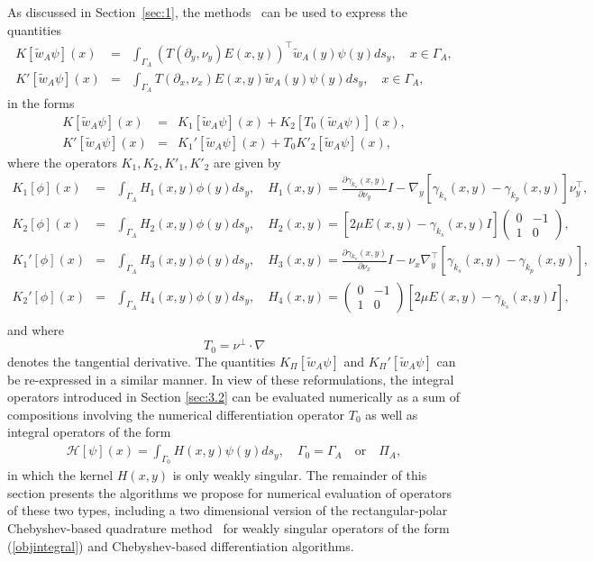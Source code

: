 \documentclass[10pt]{article}
\numberwithin{equation}{section}
\newcommand{\be}{\begin{eqnarray}}
\newcommand{\ben}{\begin{eqnarray*}}
\newcommand{\en}{\end{eqnarray}}
\newcommand{\enn}{\end{eqnarray*}}
\newcommand{\pa}{\partial}
\begin{document}
As discussed in Section~\ref{sec:1}, the methods~\cite{YHX17} can be used to express the
quantities \be
\label{KWA}
K[\widetilde{w}_A\psi](x)&=&\int_{\Gamma_A} (T(\pa_y,\nu_y)E(x,y))^\top \widetilde{w}_A(y)\psi(y)ds_y,\quad x\in\Gamma_A,\\
\label{KPWA}
K'[\widetilde{w}_A\psi](x)&=&\int_{\Gamma_A}
T(\pa_x,\nu_x)E(x,y)\widetilde{w}_A(y)\psi(y)ds_y,\quad x\in\Gamma_A,
\en 
in the forms
\be
\label{operatorK}
K[\widetilde{w}_A\psi](x) &=& K_1[\widetilde{w}_A\psi](x)+K_2\left[ T_0(\widetilde{w}_A\psi) \right](x),\\
\label{operatorKP}
K'[\widetilde{w}_A\psi](x) &=& K_1'[\widetilde{w}_A\psi](x)+T_0K'_2\left[\widetilde{w}_A\psi \right](x),
\en
where the operators $K_1,K_2,K'_1,K'_2$ are given by
\ben
K_1[\phi](x) &=& \int_{\Gamma_A} H_1(x,y)\phi(y)ds_y, \quad H_1(x,y)=\frac{\pa \gamma_{k_s}(x,y)}{\pa\nu_y}I- \nabla_y[\gamma_{k_s}(x,y)-\gamma_{k_p}(x,y)]\nu_y^\top,\\
K_2[\phi](x) &=& \int_{\Gamma_A} H_2(x,y)\phi(y)ds_y, \quad H_2(x,y)=[2\mu E(x,y)-\gamma_{k_s}(x,y)I]\begin{pmatrix}
0 & -1 \\
1 & 0
\end{pmatrix},\\
K_1'[\phi](x) &=& \int_{\Gamma_A} H_3(x,y)\phi(y)ds_y, \quad H_3(x,y)=\frac{\pa \gamma_{k_s}(x,y)}{\pa\nu_x}I- \nu_x\nabla_y^\top[\gamma_{k_s}(x,y)-\gamma_{k_p}(x,y)],\\
K_2'[\phi](x) &=& \int_{\Gamma_A} H_4(x,y)\phi(y)ds_y, \quad H_4(x,y)=\begin{pmatrix}
0 & -1 \\
1 & 0
\end{pmatrix}[2\mu E(x,y)-\gamma_{k_s}(x,y)I],\\
\enn and where
\[T_0=\nu^\perp\cdot\nabla\]
denotes the tangential
derivative. The quantities $K_\Pi[\widetilde{w}_A\psi]$ and
$K_\Pi'[\widetilde{w}_A\psi]$ can be re-expressed in a similar
manner. In view of these reformulations, the integral operators
introduced in Section \ref{sec:3.2} can be evaluated numerically as a
sum of compositions involving the numerical differentiation operator
$T_0$ as well as integral operators of the form \be
\label{objintegral}
\mathcal{H}[\psi](x)= \int_{\Gamma_0} H(x,y)\psi(y)ds_y,\quad
\Gamma_0=\Gamma_A\quad\mbox{or}\quad \Pi_A, \en in which the kernel
$H(x,y)$ is only weakly singular. The remainder of this section
presents the algorithms we propose for numerical evaluation of
operators of these two types, including a two dimensional version of
the rectangular-polar Chebyshev-based quadrature method~\cite{BG18}
for weakly singular operators of the form (\ref{objintegral}) and
Chebyshev-based differentiation algorithms.
\end{document}
